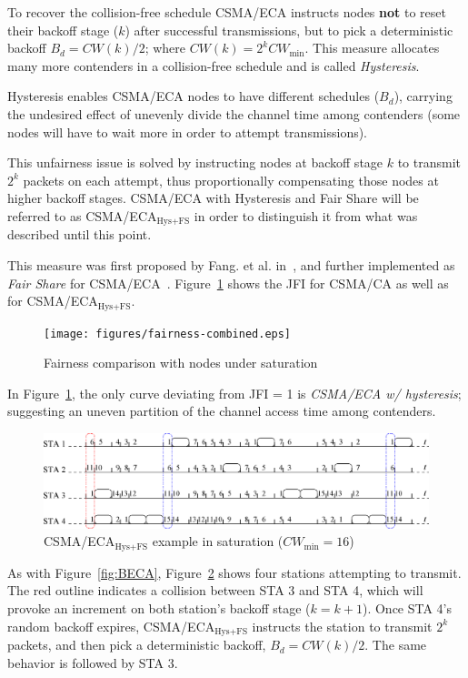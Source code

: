 \documentclass[a4paper,journal]{IEEEtran}
\begin{document}
	To recover the collision-free schedule CSMA/ECA instructs nodes {\bfseries not} to reset their backoff stage ($k$) after successful transmissions, but to pick a deterministic backoff $B_{d}=CW(k)/2$; where $CW(k)=2^{k}CW_{\min}$. This measure allocates many more contenders in a collision-free schedule and is called \emph{Hysteresis}.
	
	Hysteresis enables CSMA/ECA nodes to have different schedules ($B_{d}$), carrying the undesired effect of unevenly divide the channel time among contenders (some nodes will have to wait more in order to attempt transmissions).
	
	This unfairness issue is solved by instructing nodes at backoff stage $k$ to transmit $2^{k}$ packets on each attempt, thus proportionally compensating those nodes at higher backoff stages. CSMA/ECA with Hysteresis and Fair Share will be referred to as CSMA/ECA$_{\text{Hys+FS}}$ in order to distinguish it from what was described until this point.
	
	This measure was first proposed by Fang. et al. in~\cite{L_MAC}, and further implemented as \emph{Fair Share} for CSMA/ECA~\cite{research2standards}. Figure~\ref{fig:fairness} shows the JFI for CSMA/CA as well as for CSMA/ECA$_{\text{Hys+FS}}$.
	
	\begin{figure}[htbp]
	\centering
		\texttt{[image: figures/fairness-combined.eps]}
		\caption{Fairness comparison with nodes under saturation}
		\label{fig:fairness}
	\end{figure}
	
	In Figure~\ref{fig:fairness}, the only curve deviating from JFI = 1 is \emph{CSMA/ECA w/ hysteresis}; suggesting an uneven partition of the channel access time among contenders.
	
	\begin{figure}[tbhp]
	\centering
		\includegraphics[width=0.8\linewidth]{figures/csma_eca_different_backoff_short.eps}
		\caption{CSMA/ECA$_{\text{Hys+FS}}$ example in saturation ($CW_{\min}=16$)}
		\label{fig:ECA+Hyst}
	\end{figure}
	
	As with Figure~\ref{fig:BECA}, Figure~\ref{fig:ECA+Hyst} shows four stations attempting to transmit. The red outline indicates a collision between STA 3 and STA 4, which will provoke an increment on both station's backoff stage ($k=k+1$). Once STA 4's random backoff expires, CSMA/ECA$_{\text{Hys+FS}}$ instructs the station to transmit $2^{k}$ packets, and then pick a deterministic backoff, $B_{d}=CW(k)/2$. The same behavior is followed by STA 3.
	
\end{document}
